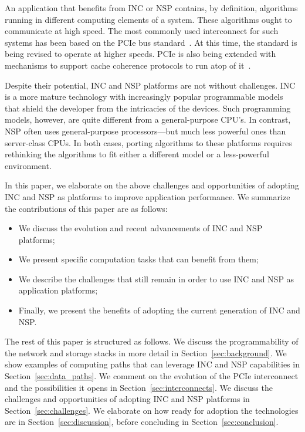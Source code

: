 \documentclass[11pt,dvipdfmx]{article}
\begin{document}
An application that benefits from INC or NSP contains, by definition, algorithms
running in different computing elements of a system.
These algorithms ought to communicate at high speed.
The most commonly used interconnect for such systems has been based on the
PCIe bus standard~\cite{budruk03}.
At this time, the standard is being revised to operate at higher speeds.
PCIe is also being extended with mechanisms to support cache coherence protocols
to run atop of it~\cite{ccix19, cxl19}.


Despite their potential, INC and NSP platforms are not without challenges.
INC is a more mature technology with increasingly popular programmable models
that shield the developer from the intricacies of the devices.
Such programming models, however, are quite different from a general-purpose
CPU’s.
In contrast, NSP often uses general-purpose processors---but much less powerful
ones than server-class CPUs.
In both cases, porting algorithms to these platforms requires rethinking the
algorithms to fit either a different model or a less-powerful environment.


In this paper, we elaborate on the above challenges and opportunities of
adopting INC and NSP as platforms to improve application performance.
We summarize the contributions of this paper are as follows:
\begin{itemize}
  \setlength{\itemsep}{0pt}
  \setlength{\parsep}{0pt}
  \setlength{\parskip}{0pt}
  \setlength{\topsep}{0pt}
  \setlength{\partopsep}{0pt}
\item We discuss the evolution and recent advancements of INC and NSP platforms;
\item We present specific computation tasks that can benefit from them;
\item We describe the challenges that still remain in order to use INC and NSP
  as application platforms;
\item Finally, we present the benefits of adopting the current generation of INC
  and NSP.
\end{itemize}


The rest of this paper is structured as follows.
We discuss the programmability of the network and storage stacks in more detail
in Section~\ref{sec:background}.
We show examples of computing paths that can leverage INC and NSP capabilities in
Section~\ref{sec:data_paths}.
We comment on the evolution of the PCIe interconnect and the possibilities it
opens in Section~\ref{sec:interconnects}.
We discuss the challenges and opportunities of adopting INC and NSP platforms in
Section~\ref{sec:challenges}.
We elaborate on how ready for adoption the technologies are in
Section~\ref{sec:discussion}, before concluding in Section~\ref{sec:conclusion}.
\end{document}
